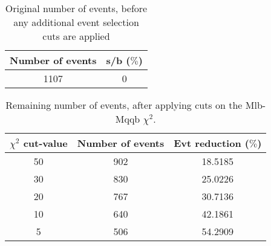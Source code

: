 \documentclass{article}
\begin{document}
 

 \begin{abstract} 
 
   The tables in this document represent the influence of the additional event selection cuts that were applied in order to reduce the number of selected events for CPU reasons. \\ 
   The considered cuts are rather basic and are merely developed to reduce the number of so-called wrong events \\ 
   \begin{itemize} 
     \item Cut on Mlb-Mqqb $\chi^{2}$ distribution 
     \item Cut on top and W-mass window 
   \end{itemize} 
 
   \textbf{Created on :} \today 
 \end{abstract} 
 
 \begin{table}[h!t] 
  \caption{Original number of events, before any additional event selection cuts are applied} 
  \centering 
   \begin{tabular}{c|c} 
     Number of events    & s/b ($\%$)     \\ 
     \hline
     1107  & 0 
 
   \end{tabular} 
 \end{table} 
 
 \begin{table}[h!t] 
  \caption{Remaining number of events, after applying cuts on the Mlb-Mqqb $\chi^{2}$.} 
  \centering 
   \begin{tabular}{c|c|c|} 
     $\chi^{2}$ cut-value    & Number of events  & Evt reduction ($\%$)    \\ 
     \hline
     50  &   902  &  18.5185 \\ 
     30  &   830  &  25.0226 \\ 
     20  &   767  &  30.7136 \\ 
     10  &   640  &  42.1861 \\ 
     5  &   506  &  54.2909 \\ 
   \end{tabular} 
 \end{table} 
 
\end{document}
